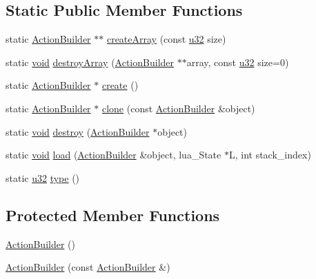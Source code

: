 \subsection*{Static Public Member Functions}
\begin{DoxyCompactItemize}
\item 
static \mbox{\hyperlink{classnjli_1_1_action_builder}{Action\+Builder}} $\ast$$\ast$ \mbox{\hyperlink{classnjli_1_1_action_builder_a43d1a1223217032a1c9e1f7c0312b89a}{create\+Array}} (const \mbox{\hyperlink{_util_8h_a10e94b422ef0c20dcdec20d31a1f5049}{u32}} size)
\item 
static \mbox{\hyperlink{_thread_8h_af1e856da2e658414cb2456cb6f7ebc66}{void}} \mbox{\hyperlink{classnjli_1_1_action_builder_aa1ef775a2c7fa6f4b82c205c2aa815db}{destroy\+Array}} (\mbox{\hyperlink{classnjli_1_1_action_builder}{Action\+Builder}} $\ast$$\ast$array, const \mbox{\hyperlink{_util_8h_a10e94b422ef0c20dcdec20d31a1f5049}{u32}} size=0)
\item 
static \mbox{\hyperlink{classnjli_1_1_action_builder}{Action\+Builder}} $\ast$ \mbox{\hyperlink{classnjli_1_1_action_builder_a8bbc5b7faffee5487928032a955bba6b}{create}} ()
\item 
static \mbox{\hyperlink{classnjli_1_1_action_builder}{Action\+Builder}} $\ast$ \mbox{\hyperlink{classnjli_1_1_action_builder_aa04be710105bbb879fccf8b5f950519a}{clone}} (const \mbox{\hyperlink{classnjli_1_1_action_builder}{Action\+Builder}} \&object)
\item 
static \mbox{\hyperlink{_thread_8h_af1e856da2e658414cb2456cb6f7ebc66}{void}} \mbox{\hyperlink{classnjli_1_1_action_builder_a41bc319da348dc6a8388bbec26cfd93e}{destroy}} (\mbox{\hyperlink{classnjli_1_1_action_builder}{Action\+Builder}} $\ast$object)
\item 
static \mbox{\hyperlink{_thread_8h_af1e856da2e658414cb2456cb6f7ebc66}{void}} \mbox{\hyperlink{classnjli_1_1_action_builder_a86ba01c9ee80e198442a46b3cd5f9d7f}{load}} (\mbox{\hyperlink{classnjli_1_1_action_builder}{Action\+Builder}} \&object, lua\+\_\+\+State $\ast$L, int stack\+\_\+index)
\item 
static \mbox{\hyperlink{_util_8h_a10e94b422ef0c20dcdec20d31a1f5049}{u32}} \mbox{\hyperlink{classnjli_1_1_action_builder_a569cbb4a019aabaf3f77c13f20625d8b}{type}} ()
\end{DoxyCompactItemize}
\subsection*{Protected Member Functions}
\begin{DoxyCompactItemize}
\item 
\mbox{\hyperlink{classnjli_1_1_action_builder_a4722e62e278de2668faf92c26fe7f71b}{Action\+Builder}} ()
\item 
\mbox{\hyperlink{classnjli_1_1_action_builder_abc0b4b0332ee13e9e1a8f7121196ef10}{Action\+Builder}} (const \mbox{\hyperlink{classnjli_1_1_action_builder}{Action\+Builder}} \&)
\end{DoxyCompactItemize}
